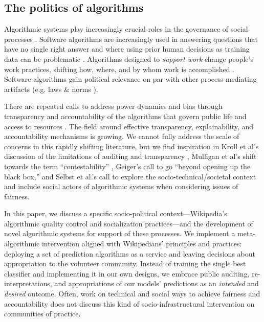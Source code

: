 \subsection{The politics of algorithms}
Algorithmic systems play increasingly crucial roles in the governance of social processes \cite{gillespie2014relevance}. Software algorithms are increasingly used in answering questions that have no single right answer and where using prior human decisions as training data can be problematic \cite{barocas2013governing}. Algorithms designed to \emph{support work} change people's work practices, shifting how, where, and by whom work is accomplished \cite{crawford2016algorithm, zuboff1988age}. Software algorithms gain political relevance on par with other process-mediating artifacts (e.g. laws \& norms \cite{lessig1999code}).

There are repeated calls to address power dynamics and bias through transparency and accountability of the algorithms that govern public life and access to resources \cite{diakopoulos2017algorithmic,sandvig2014auditing}. The field around effective transparency, explainability, and accountability mechanisms is growing. We cannot fully address the scale of concerns in this rapidly shifting literature, but we find inspiration in Kroll et al's discussion of the limitations of auditing and transparency \cite{kroll2016accountable}, Mulligan et al's shift towards the term ``contestability'' \cite{mulligan2019shaping}, Geiger's call to go ``beyond opening up the black box\cite{geiger2017beyond},'' and Selbst et al.'s call to explore the socio-technical/societal context and include social actors of algorithmic systems when considering issues of fairness.

In this paper, we discuss a specific socio-political context---Wikipedia's algorithmic quality control and socialization practices---and the development of novel algorithmic systems for support of these processes.  We implement a meta-algorithmic intervention aligned with Wikipedians' principles and practices: deploying a set of prediction algorithms as a service and leaving decisions about appropriation to the volunteer community.  Instead of training the single best classifier and implementing it in our own designs, we embrace public auditing, re-interpretations, and appropriations of our models' predictions as an \emph{intended} and \emph{desired} outcome. Often, work on technical and social ways to achieve fairness and accountability does not discuss this kind of socio-infrastructural intervention on communities of practice. 

